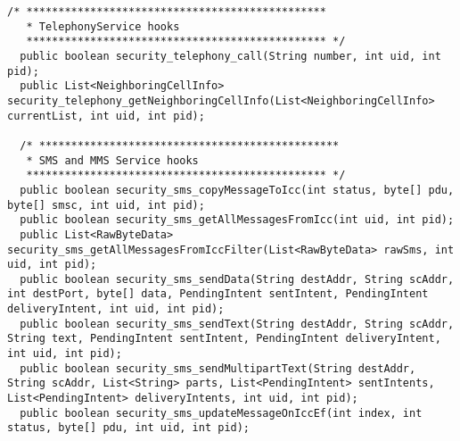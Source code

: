 \documentclass[letterpaper,twocolumn,10pt]{article}
\begin{document}
\begin{lstlisting}[emph={},basicstyle=\footnotesize,caption={Interface for Access Control Policy Modules}]
  /* ***********************************************
   * TelephonyService hooks
   *********************************************** */
  public boolean security_telephony_call(String number, int uid, int pid);
  public List<NeighboringCellInfo> security_telephony_getNeighboringCellInfo(List<NeighboringCellInfo> currentList, int uid, int pid);
  
  /* ***********************************************
   * SMS and MMS Service hooks
   *********************************************** */
  public boolean security_sms_copyMessageToIcc(int status, byte[] pdu, byte[] smsc, int uid, int pid);
  public boolean security_sms_getAllMessagesFromIcc(int uid, int pid);
  public List<RawByteData> security_sms_getAllMessagesFromIccFilter(List<RawByteData> rawSms, int uid, int pid);
  public boolean security_sms_sendData(String destAddr, String scAddr, int destPort, byte[] data, PendingIntent sentIntent, PendingIntent deliveryIntent, int uid, int pid);
  public boolean security_sms_sendText(String destAddr, String scAddr, String text, PendingIntent sentIntent, PendingIntent deliveryIntent, int uid, int pid);
  public boolean security_sms_sendMultipartText(String destAddr, String scAddr, List<String> parts, List<PendingIntent> sentIntents, List<PendingIntent> deliveryIntents, int uid, int pid);
  public boolean security_sms_updateMessageOnIccEf(int index, int status, byte[] pdu, int uid, int pid);
  

\end{lstlisting}
\end{document}
